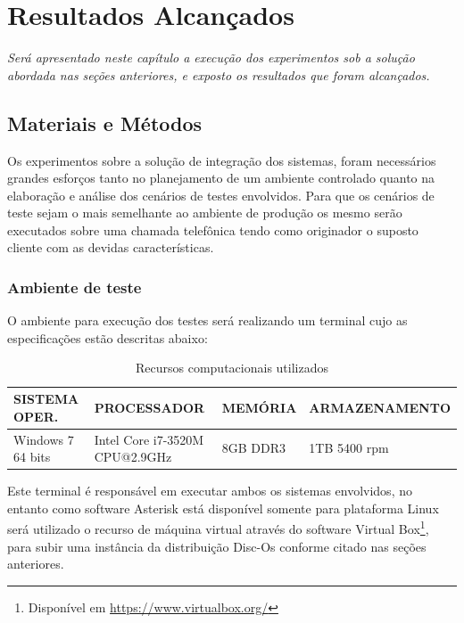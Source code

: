 \chapter[Resultados Alcançados]{\textbf{R}esultados \textbf{A}lcançados}

\textit{Será apresentado neste capítulo a execução dos experimentos sob a solução abordada nas seções anteriores, e exposto os resultados que foram alcançados.}

\section{Materiais e Métodos}

Os experimentos sobre a solução de integração dos sistemas, foram necessários grandes esforços tanto no planejamento de um ambiente controlado quanto na elaboração e análise dos cenários de testes envolvidos. Para que os cenários de teste sejam o mais semelhante ao ambiente de produção os mesmo serão executados sobre uma chamada telefônica tendo como originador o suposto cliente com as devidas características. 

\subsection{Ambiente de teste}

O ambiente para execução dos testes será realizando um terminal cujo as especificações estão descritas abaixo:

\begin{table}[htb]
	\footnotesize
	\caption{Recursos computacionais utilizados}
	\label{tabela:recursosUtilizados}
	\begin{tabular}{|p{3.5cm}|p{3cm}|p{2cm}|p{4cm}|} \hline
		\textbf{SISTEMA OPER.} 	& \textbf{PROCESSADOR} 				& \textbf{MEMÓRIA} 	& \textbf{ARMAZENAMENTO}  \\ \hline
		Windows 7 64 bits 		& Intel Core i7-3520M CPU@2.9GHz 	& 8GB DDR3			& 1TB 5400 rpm \\ \hline
	\end{tabular}
\end{table}

Este terminal é responsável em executar ambos os sistemas envolvidos, no entanto como software Asterisk está disponível somente para plataforma Linux será utilizado o recurso de máquina virtual através do software Virtual Box\footnote{Disponível em \url{https://www.virtualbox.org/}}, para subir uma instância da distribuição Disc-Os conforme citado nas seções anteriores.
 
